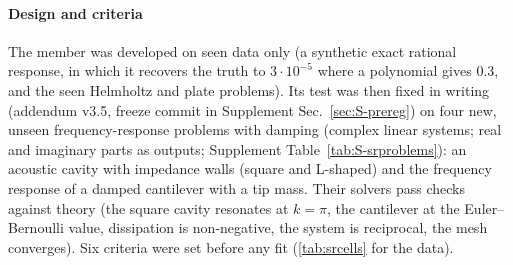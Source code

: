 \paragraph{Design and criteria} The member was developed on seen data only (a synthetic exact rational response, in which it recovers the truth to $3\cdot10^{-5}$ where a polynomial gives 0.3, and the seen Helmholtz and plate problems). Its test was then fixed in writing (addendum v3.5, freeze commit in Supplement Sec.~\ref{sec:S-prereg}) on four new, unseen frequency-response problems with damping (complex linear systems; real and imaginary parts as outputs; Supplement Table~\ref{tab:S-srproblems}): an acoustic cavity with impedance walls (square and L-shaped) and the frequency response of a damped cantilever with a tip mass. Their solvers pass checks against theory (the square cavity resonates at $k=\pi$, the cantilever at the Euler--Bernoulli value, dissipation is non-negative, the system is reciprocal, the mesh converges). Six criteria were set before any fit (\cref{tab:srcells} for the data).
\begin{table}[t]\centering\caption{Frequency-response problems: test error (geometric mean over three seeds) of the model selected by the tool with the old pool (seven classical members), with the pool that includes the rational member, and of the tuned network; and how often the rational member was chosen.}\label{tab:srcells}\small\resizebox{\textwidth}{!}{}\end{table}
